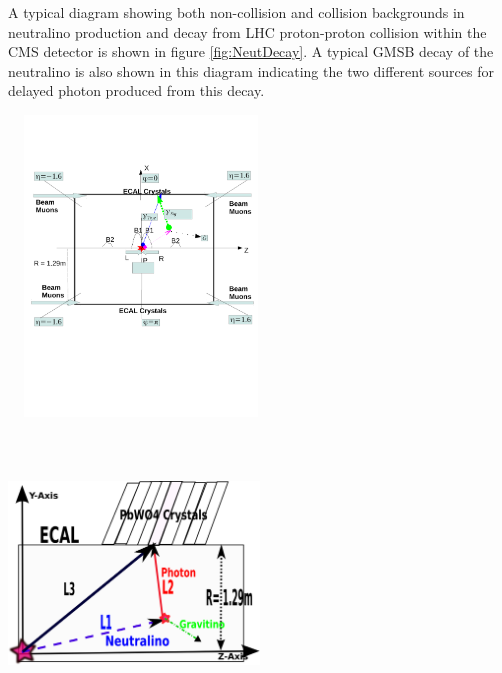 A typical diagram showing both non-collision and collision backgrounds in neutralino production and decay from LHC proton-proton collision within the CMS detector is shown in figure \ref{fig:NeutDecay}. A typical GMSB decay of the neutralino is also shown in this diagram indicating the two different sources for delayed photon produced from this decay.
\begin{center}
\centering
\mbox{
\includegraphics[height=8cm, width=0.5\textwidth]{THESISPLOTS/Background_Delayed_Photon.pdf}
\includegraphics[height=8cm, width=0.5\textwidth]{THESISPLOTS/DelayedPhoton-ECAL.png}}
\label{fig:NeutDecay}
\end{center}

